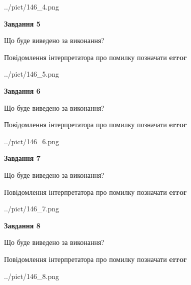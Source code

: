 \documentclass[12pt, ukrainian]{article}
\begin{document}
{\begin{center}
	{../pict/146_4.png}
\end{center}
\newpage

{\begin {center}\textbf{Завдання 5}\end {center}}\par
Що буде виведено за виконання? \par
Повідомлення інтерпретатора про помилку позначати \textbf{error}

\begin{center}
	{../pict/146_5.png}
\end{center}
\newpage

{\begin {center}\textbf{Завдання 6}\end {center}}\par
Що буде виведено за виконання? \par
Повідомлення інтерпретатора про помилку позначати \textbf{error}

\begin{center}
	{../pict/146_6.png}
\end{center}
\newpage

{\begin {center}\textbf{Завдання 7}\end {center}}\par
Що буде виведено за виконання? \par
Повідомлення інтерпретатора про помилку позначати \textbf{error}

\begin{center}
	{../pict/146_7.png}
\end{center}
\newpage

{\begin {center}\textbf{Завдання 8}\end {center}}\par
Що буде виведено за виконання? \par
Повідомлення інтерпретатора про помилку позначати \textbf{error}

\begin{center}
	{../pict/146_8.png}
\end{center}
\newpage

}
\end{document}
